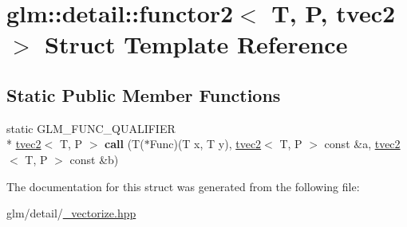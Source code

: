 \hypertarget{structglm_1_1detail_1_1functor2_3_01T_00_01P_00_01tvec2_01_4}{\section{glm\-:\-:detail\-:\-:functor2$<$ T, P, tvec2 $>$ Struct Template Reference}
\label{structglm_1_1detail_1_1functor2_3_01T_00_01P_00_01tvec2_01_4}
}
\subsection*{Static Public Member Functions}
\begin{DoxyCompactItemize}
\item 
\hypertarget{structglm_1_1detail_1_1functor2_3_01T_00_01P_00_01tvec2_01_4_a3f747eea2648beb35126086723c1797f}{static G\-L\-M\-\_\-\-F\-U\-N\-C\-\_\-\-Q\-U\-A\-L\-I\-F\-I\-E\-R \\*
\hyperlink{structglm_1_1tvec2}{tvec2}$<$ T, P $>$ {\bfseries call} (T($\ast$Func)(T x, T y), \hyperlink{structglm_1_1tvec2}{tvec2}$<$ T, P $>$ const \&a, \hyperlink{structglm_1_1tvec2}{tvec2}$<$ T, P $>$ const \&b)}\label{structglm_1_1detail_1_1functor2_3_01T_00_01P_00_01tvec2_01_4_a3f747eea2648beb35126086723c1797f}

\end{DoxyCompactItemize}


The documentation for this struct was generated from the following file\-:\begin{DoxyCompactItemize}
\item 
glm/detail/\hyperlink{__vectorize_8hpp}{\-\_\-vectorize.\-hpp}\end{DoxyCompactItemize}
